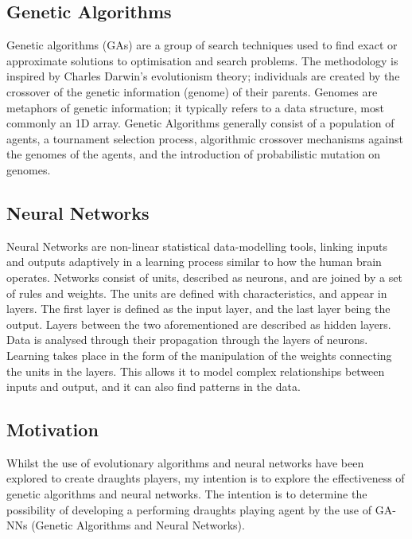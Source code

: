 \documentclass[12pt,a4paper]{article}
\begin{document}
    \subsection*{Genetic Algorithms}

    Genetic algorithms (GAs) are a group of search techniques used to find exact or approximate solutions to optimisation and search problems. The methodology is inspired by Charles Darwin's evolutionism theory; individuals are created by the crossover of the genetic information (genome) of their parents. Genomes are metaphors of genetic information; it typically refers to a data structure, most commonly an 1D array. Genetic Algorithms generally consist of a population of agents, a tournament selection process, algorithmic crossover mechanisms against the genomes of the agents, and the introduction of probabilistic mutation on genomes. 

    \subsection*{Neural Networks}

    Neural Networks are non-linear statistical data-modelling tools, linking inputs and outputs adaptively in a learning process similar to how the human brain operates. Networks consist of units, described as neurons, and are joined by a set of rules and weights. The units are defined with characteristics, and appear in layers. The first layer is defined as the input layer, and the last layer being the output. Layers between the two aforementioned are described as hidden layers. Data is analysed through their propagation through the layers of neurons. Learning takes place in the form of the manipulation of the weights connecting the units in the layers. This allows it to model complex relationships between inputs and output, and it can also find patterns in the data. 

    \subsection*{Motivation}
    Whilst the use of evolutionary algorithms and neural networks have been explored to create draughts players, my intention is to explore the effectiveness of genetic algorithms and neural networks. The intention is to determine the possibility of developing a performing draughts playing agent by the use of GA-NNs (Genetic Algorithms and Neural Networks).


\end{document}
